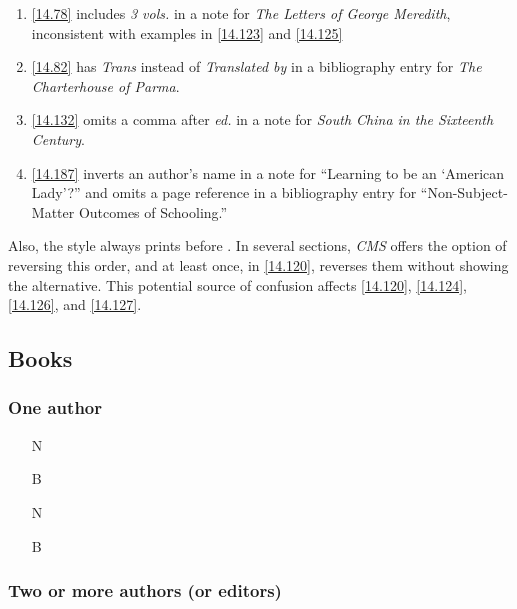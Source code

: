 \documentclass[11pt,letterpaper,oneside]{article}
\begin{document}
\begin{enumerate} \item \ref{14.78} includes \textit{3 vols.} in a
note for \textit{The Letters of George Meredith}, inconsistent with
examples in \ref{14.123} and \ref{14.125}

\item \ref{14.82} has \textit{Trans} instead of \textit{Translated by}
in a bibliography entry for \textit{The Charterhouse of Parma}.

\item \ref{14.132} omits a comma after \textit{ed.} in a note for
\textit{South China in the Sixteenth Century}.

\item \ref{14.187} inverts an author's name in a note for ``Learning
to be an `American Lady'?'' and omits a page reference in a
bibliography entry for ``Non-Subject-Matter Outcomes of Schooling.''
\end{enumerate}

\noindent Also, the style always prints  before
. In several sections, \textit{CMS} offers the
option of reversing this order, and at least once, in \ref{14.120},
reverses them without showing the alternative. This potential source
of confusion affects \ref{14.120}, \ref{14.124}, \ref{14.126}, and
\ref{14.127}.

\subsection{Books}
\setcounter{subsection}{14}

\setcounter{subsubsection}{74}
\subsubsection{One author}

\begin{itemize}
\item[N] 

\item[B] 

\item[N] 

\item[B] 
\end{itemize}

\subsubsection{Two or more authors (or editors)}
\label{14.76}
\end{document}
